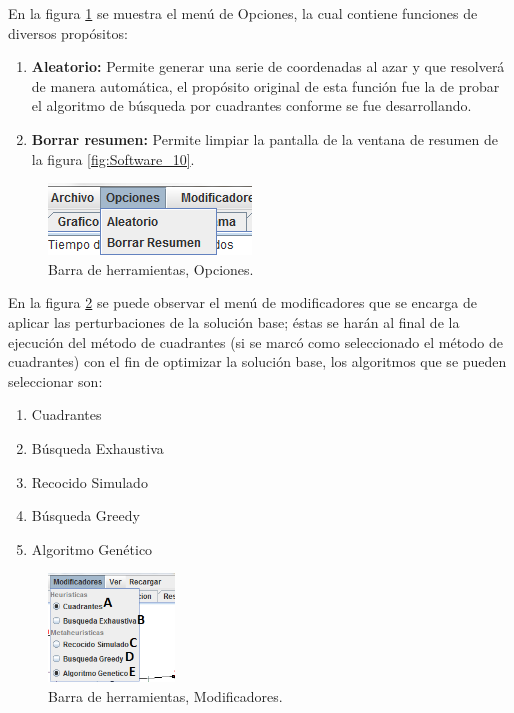 \hspace*{1cm}En la figura \ref {fig:Software_5} se muestra el menú de Opciones, la cual contiene funciones de diversos propósitos:
\begin{enumerate}[label=\Alph*.-]
\item  \textbf{Aleatorio:} Permite generar una serie de coordenadas al azar y que resolverá de manera automática, el propósito original de esta función fue la de probar el algoritmo de búsqueda por cuadrantes conforme se fue desarrollando.
\item  \textbf{Borrar resumen:} Permite limpiar la pantalla de la ventana de resumen de la figura \ref {fig:Software_10}.
\end{enumerate}
     \begin{figure}[hbtp]
        \centering
            \includegraphics{Software/Imagenes/Software_5.png}
            \caption{Barra de herramientas, Opciones.}
            \label{fig:Software_5}
    \end{figure}

\hspace*{1cm}En la figura \ref {fig:Software_6} se puede observar el menú de modificadores que se encarga de aplicar las perturbaciones de la solución base; éstas se harán al final de la ejecución del método de cuadrantes (si se marcó como seleccionado el método de cuadrantes) con el fin de optimizar la solución base, los algoritmos que se pueden seleccionar son:
    
\begin{enumerate}[label=\Alph*.-]
\item Cuadrantes 
\item Búsqueda Exhaustiva
\item Recocido Simulado
\item Búsqueda Greedy
\item Algoritmo Genético
\end{enumerate}

     \begin{figure}[hbtp]
        \centering
            \includegraphics[width=0.3\textwidth]{Software/Imagenes/Software_6.png}
            \caption{Barra de herramientas, Modificadores.}
            \label{fig:Software_6}
    \end{figure}
    
